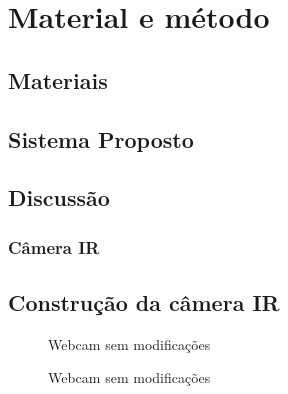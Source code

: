 \chapter{Material e método}

\section{Materiais}
\section{Sistema Proposto}
\section{Discussão}

\subsection{Câmera IR}


\section{Construção da câmera IR}


\begin{figure}[ht!]
\centering
{}
  \caption{Webcam sem modificações}
  \label{fig:webcam01}
\end{figure} 

\begin{figure}[ht!]
\centering
{}
  \caption{Webcam sem modificações}
  \label{fig:webcam02}
\end{figure} 


